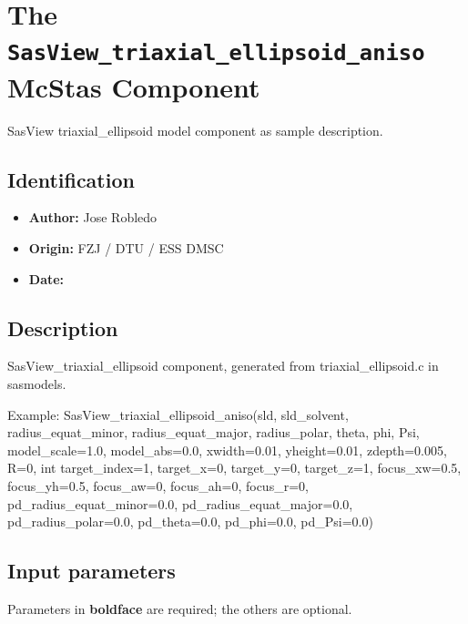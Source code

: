 \section{The \texttt{SasView\_triaxial\_ellipsoid\_aniso} McStas Component}
SasView triaxial\_ellipsoid model component as sample description.

\subsection*{Identification}
\begin{itemize}
  \item \textbf{Author:} Jose Robledo
  \item \textbf{Origin:} FZJ / DTU / ESS DMSC
  \item \textbf{Date:} 
\end{itemize}

\subsection*{Description}
SasView\_triaxial\_ellipsoid component, generated from triaxial\_ellipsoid.c in sasmodels.

Example: SasView\_triaxial\_ellipsoid\_aniso(sld, sld\_solvent, radius\_equat\_minor, radius\_equat\_major, radius\_polar, theta, phi, Psi, model\_scale=1.0, model\_abs=0.0, xwidth=0.01, yheight=0.01, zdepth=0.005, R=0, int target\_index=1, target\_x=0, target\_y=0, target\_z=1, focus\_xw=0.5, focus\_yh=0.5, focus\_aw=0, focus\_ah=0, focus\_r=0, pd\_radius\_equat\_minor=0.0, pd\_radius\_equat\_major=0.0, pd\_radius\_polar=0.0, pd\_theta=0.0, pd\_phi=0.0, pd\_Psi=0.0)

\subsection*{Input parameters}
Parameters in \textbf{boldface} are required; the others are optional.

